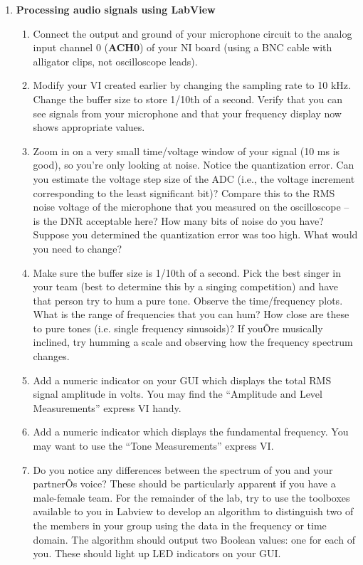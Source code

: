 \documentclass[12pt]{article}
\begin{document}
\begin{enumerate}
\item {\bf Processing audio signals using LabView}
\begin{enumerate}
\item Connect the output and ground of your microphone circuit to the analog input channel 0 (\textbf{ACH0}) of your NI board (using a BNC cable with alligator clips, not oscilloscope leads). 
\item Modify your VI created earlier by changing the sampling rate to 10 kHz. Change the buffer size to store 1/10th of a second. 
Verify that you can see signals from your microphone and that your frequency display now shows appropriate values.
\item Zoom in on a very small time/voltage window of your signal (10 ms is good), so you're only looking at noise. 
Notice the quantization error. Can you estimate the voltage step size of the ADC (i.e., the voltage increment corresponding to the least significant bit)?
Compare this to the RMS noise voltage of the microphone that you measured on the oscilloscope -- is the DNR acceptable here? How many bits of noise do you have? 
Suppose you determined the quantization error was too high. What would you need to change?
\item Make sure the buffer size is 1/10th of a second. 
Pick the best singer in your team (best to determine this by a singing competition) and have that person try to hum a pure tone.  
Observe the time/frequency plots.  What is the range of frequencies that you can hum?  
How close are these to pure tones (i.e. single frequency sinusoids)?  
If youÕre musically inclined, try humming a scale and observing how the frequency spectrum changes.  
\item Add a numeric indicator on your GUI which displays the total RMS signal amplitude in volts.  
You may find the ``Amplitude and Level Measurements'' express VI handy.  
\item Add a numeric indicator which displays the fundamental frequency.  You may want to use the ``Tone Measurements'' express VI. 
\item Do you notice any differences between the spectrum of you and your partnerÕs voice?  
These should be particularly apparent if you have a male-female team.  
For the remainder of the lab, 
try to use the toolboxes available to you in Labview to develop an 
algorithm to distinguish two of the members in your group using the data in the frequency or time domain.  
The algorithm should output two Boolean values: one for each of you.  
These should light up LED indicators on your GUI.  

\end{enumerate}
\end{enumerate}
\end{document}
